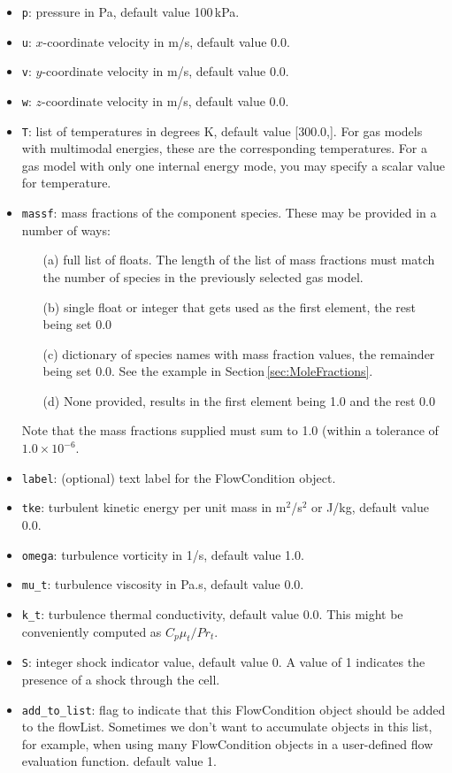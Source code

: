 \documentclass[12pt,a4paper,twoside]{article}
\begin{document}
%
\begin{itemize}
  \item \texttt{p}: pressure in Pa, default value 100\,kPa.
  \item \texttt{u}: $x$-coordinate velocity in m/s, default value 0.0.
  \item \texttt{v}: $y$-coordinate velocity in m/s, default value 0.0.
  \item \texttt{w}: $z$-coordinate velocity in m/s, default value 0.0.
  \item \texttt{T}: list of temperatures in degrees K, default value [300.0,].
    For gas models with multimodal energies, these are the corresponding temperatures.
    For a gas model with only one internal energy mode, you may specify a scalar value
    for temperature.
  \item \texttt{massf}: mass fractions of the component species.
    These may be provided in a number of ways:
    \begin{itemize}
      \item[(a)] full list of floats. The length of the list of mass fractions 
         must match the number of species in the previously selected gas model.
      \item[(b)] single float or integer that gets used as the first element,
         the rest being set 0.0
      \item[(c)] dictionary of species names with mass fraction values,
         the remainder being set 0.0.  See the example in Section\,\ref{sec:MoleFractions}.
      \item[(d)] None provided, results in the first element being 1.0
         and the rest 0.0
    \end{itemize}
    Note that the mass fractions supplied must sum to 1.0 (within a tolerance of $1.0 \times 10^{-6}$.
  \item \texttt{label}: (optional) text label for the FlowCondition object.
  \item \texttt{tke}: turbulent kinetic energy per unit mass in m$^2$/s$^2$ or
    J/kg, default value 0.0.
  \item \texttt{omega}: turbulence vorticity in 1/s, default value 1.0.
  \item \texttt{mu\_t}: turbulence viscosity in Pa.s, default value 0.0.
  \item \texttt{k\_t}: turbulence thermal conductivity, default value 0.0.
     This might be conveniently computed as $C_p \mu_t / Pr_t$.
  \item \texttt{S}: integer shock indicator value, default value 0.
    A value of 1 indicates the presence of a shock through the cell.
  \item \texttt{add\_to\_list}: flag to indicate that this FlowCondition object 
    should be added to the flowList.  Sometimes we don't want
    to accumulate objects in this list, for example, when using
    many FlowCondition objects in a user-defined flow evaluation function.
    default value 1.
\end{itemize}
\end{document}
